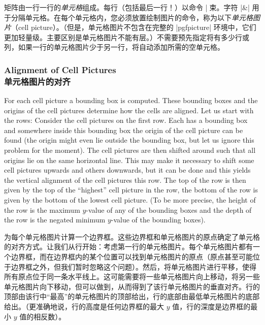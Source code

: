 矩阵由一行一行的\emph{单元格}组成。每行（包括最后一行！）以命令 |\| 结束。字符 |&| 用于分隔单元格。在每个单元格内，您必须放置绘制图片的命令，称为以下\emph{单元格图片}（cell picture）。（但是，单元格图片不包含在完整的 |{pgfpicture}| 环境中，它们更加轻量级。主要区别是单元格图片不能有层。）不需要预先指定将有多少行或列，如果一行的单元格图片少于另一行，将自动添加所需的空单元格。

\subsubsection{Alignment of Cell Pictures\\单元格图片的对齐}

For each cell picture a bounding box is computed. These bounding boxes and the
origins of the cell pictures determine how the cells are aligned. Let us start
with the rows: Consider the cell pictures on the first row. Each has a bounding
box and somewhere inside this bounding box the origin of the cell picture can
be found (the origin might even lie outside the bounding box, but let us ignore
this problem for the moment). The cell pictures are then shifted around such
that all origins lie on the same horizontal line. This may make it necessary to
shift some cell pictures upwards and others downwards, but it can be done and
this yields the vertical alignment of the cell pictures this row. The top of
the row is then given by the top of the ``highest'' cell picture in the row,
the bottom of the row is given by the bottom of the lowest cell picture. (To be
more precise, the height of the row is the maximum $y$-value of any of the
bounding boxes and the depth of the row is the negated minimum $y$-value of the
bounding boxes).

为每个单元格图片计算一个边界框。这些边界框和单元格图片的原点确定了单元格的对齐方式。让我们从行开始：考虑第一行的单元格图片。每个单元格图片都有一个边界框，而在边界框内的某个位置可以找到单元格图片的原点（原点甚至可能位于边界框之外，但我们暂时忽略这个问题）。然后，将单元格图片进行平移，使得所有原点位于同一条水平线上。这可能需要将一些单元格图片向上移动，将另一些单元格图片向下移动，但可以做到，从而得到了该行单元格图片的垂直对齐。行的顶部由该行中“最高”的单元格图片的顶部给出，行的底部由最低单元格图片的底部给出。（更准确地说，行的高度是任何边界框的最大 $y$ 值，行的深度是边界框的最小 $y$ 值的相反数）。

%
\begin{codeexample}[]
\end{codeexample}

